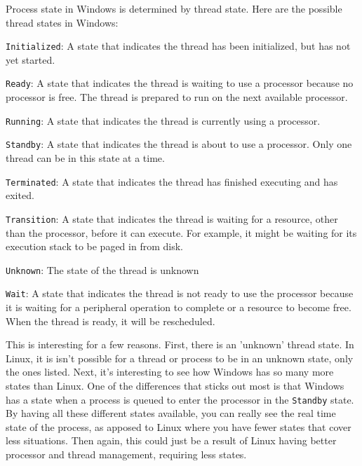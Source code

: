 Process state in Windows is determined by thread state. Here are the possible
thread states in Windows:\cite{msthreadstate2016}
\begin{description}
  \item \texttt{Initialized}: A state that indicates the thread has been initialized,
  but has not yet started.
  \item \texttt{Ready}: A state that indicates the thread is waiting to use a processor
  because no processor is free. The thread is prepared to run on the next
  available processor.
  \item \texttt{Running}: A state that indicates the thread is currently using a processor.
  \item \texttt{Standby}: A state that indicates the thread is about to use a processor.
  Only one thread can be in this state at a time.
  \item \texttt{Terminated}: A state that indicates the thread has finished executing
  and has exited.
  \item \texttt{Transition}: A state that indicates the thread is waiting for a resource, other than
  the processor, before it can execute. For example, it might be waiting for its
  execution stack to be paged in from disk.
  \item \texttt{Unknown}: The state of the thread is unknown
  \item \texttt{Wait}: A state that indicates the thread is not ready to use the processor
  because it is waiting for a peripheral operation to complete or a resource to
  become free. When the thread is ready, it will be rescheduled.
\end{description}

This is interesting for a few reasons. First, there is an 'unknown' thread state.
In Linux, it is isn't possible for a thread or process to be in an unknown state,
only the ones listed. Next, it's interesting to see how Windows has so many more
states than Linux. One of the differences that sticks out most is that Windows
has a state when a process is queued to enter the processor in the \texttt{Standby}
state.
By having all these different states available, you can really see the real time
state of the process, as apposed to Linux where you have fewer states that cover
less situations. Then again, this could just be a result of Linux having better
processor and thread management, requiring less states.


